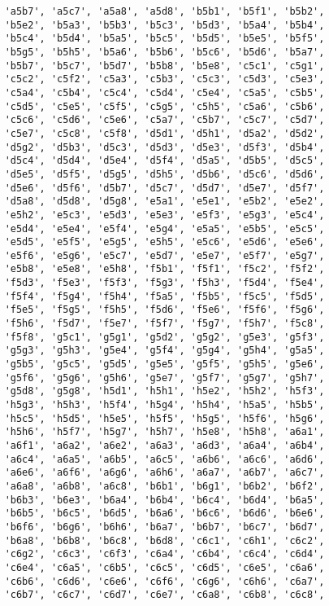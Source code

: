 \begin{verbatim}
    'a5b7', 'a5c7', 'a5a8', 'a5d8', 'b5b1', 'b5f1', 'b5b2',
    'b5e2', 'b5a3', 'b5b3', 'b5c3', 'b5d3', 'b5a4', 'b5b4',
    'b5c4', 'b5d4', 'b5a5', 'b5c5', 'b5d5', 'b5e5', 'b5f5',
    'b5g5', 'b5h5', 'b5a6', 'b5b6', 'b5c6', 'b5d6', 'b5a7',
    'b5b7', 'b5c7', 'b5d7', 'b5b8', 'b5e8', 'c5c1', 'c5g1',
    'c5c2', 'c5f2', 'c5a3', 'c5b3', 'c5c3', 'c5d3', 'c5e3',
    'c5a4', 'c5b4', 'c5c4', 'c5d4', 'c5e4', 'c5a5', 'c5b5',
    'c5d5', 'c5e5', 'c5f5', 'c5g5', 'c5h5', 'c5a6', 'c5b6',
    'c5c6', 'c5d6', 'c5e6', 'c5a7', 'c5b7', 'c5c7', 'c5d7',
    'c5e7', 'c5c8', 'c5f8', 'd5d1', 'd5h1', 'd5a2', 'd5d2',
    'd5g2', 'd5b3', 'd5c3', 'd5d3', 'd5e3', 'd5f3', 'd5b4',
    'd5c4', 'd5d4', 'd5e4', 'd5f4', 'd5a5', 'd5b5', 'd5c5',
    'd5e5', 'd5f5', 'd5g5', 'd5h5', 'd5b6', 'd5c6', 'd5d6',
    'd5e6', 'd5f6', 'd5b7', 'd5c7', 'd5d7', 'd5e7', 'd5f7',
    'd5a8', 'd5d8', 'd5g8', 'e5a1', 'e5e1', 'e5b2', 'e5e2',
    'e5h2', 'e5c3', 'e5d3', 'e5e3', 'e5f3', 'e5g3', 'e5c4',
    'e5d4', 'e5e4', 'e5f4', 'e5g4', 'e5a5', 'e5b5', 'e5c5',
    'e5d5', 'e5f5', 'e5g5', 'e5h5', 'e5c6', 'e5d6', 'e5e6',
    'e5f6', 'e5g6', 'e5c7', 'e5d7', 'e5e7', 'e5f7', 'e5g7',
    'e5b8', 'e5e8', 'e5h8', 'f5b1', 'f5f1', 'f5c2', 'f5f2',
    'f5d3', 'f5e3', 'f5f3', 'f5g3', 'f5h3', 'f5d4', 'f5e4',
    'f5f4', 'f5g4', 'f5h4', 'f5a5', 'f5b5', 'f5c5', 'f5d5',
    'f5e5', 'f5g5', 'f5h5', 'f5d6', 'f5e6', 'f5f6', 'f5g6',
    'f5h6', 'f5d7', 'f5e7', 'f5f7', 'f5g7', 'f5h7', 'f5c8',
    'f5f8', 'g5c1', 'g5g1', 'g5d2', 'g5g2', 'g5e3', 'g5f3',
    'g5g3', 'g5h3', 'g5e4', 'g5f4', 'g5g4', 'g5h4', 'g5a5',
    'g5b5', 'g5c5', 'g5d5', 'g5e5', 'g5f5', 'g5h5', 'g5e6',
    'g5f6', 'g5g6', 'g5h6', 'g5e7', 'g5f7', 'g5g7', 'g5h7',
    'g5d8', 'g5g8', 'h5d1', 'h5h1', 'h5e2', 'h5h2', 'h5f3',
    'h5g3', 'h5h3', 'h5f4', 'h5g4', 'h5h4', 'h5a5', 'h5b5',
    'h5c5', 'h5d5', 'h5e5', 'h5f5', 'h5g5', 'h5f6', 'h5g6',
    'h5h6', 'h5f7', 'h5g7', 'h5h7', 'h5e8', 'h5h8', 'a6a1',
    'a6f1', 'a6a2', 'a6e2', 'a6a3', 'a6d3', 'a6a4', 'a6b4',
    'a6c4', 'a6a5', 'a6b5', 'a6c5', 'a6b6', 'a6c6', 'a6d6',
    'a6e6', 'a6f6', 'a6g6', 'a6h6', 'a6a7', 'a6b7', 'a6c7',
    'a6a8', 'a6b8', 'a6c8', 'b6b1', 'b6g1', 'b6b2', 'b6f2',
    'b6b3', 'b6e3', 'b6a4', 'b6b4', 'b6c4', 'b6d4', 'b6a5',
    'b6b5', 'b6c5', 'b6d5', 'b6a6', 'b6c6', 'b6d6', 'b6e6',
    'b6f6', 'b6g6', 'b6h6', 'b6a7', 'b6b7', 'b6c7', 'b6d7',
    'b6a8', 'b6b8', 'b6c8', 'b6d8', 'c6c1', 'c6h1', 'c6c2',
    'c6g2', 'c6c3', 'c6f3', 'c6a4', 'c6b4', 'c6c4', 'c6d4',
    'c6e4', 'c6a5', 'c6b5', 'c6c5', 'c6d5', 'c6e5', 'c6a6',
    'c6b6', 'c6d6', 'c6e6', 'c6f6', 'c6g6', 'c6h6', 'c6a7',
    'c6b7', 'c6c7', 'c6d7', 'c6e7', 'c6a8', 'c6b8', 'c6c8',

\end{verbatim}
